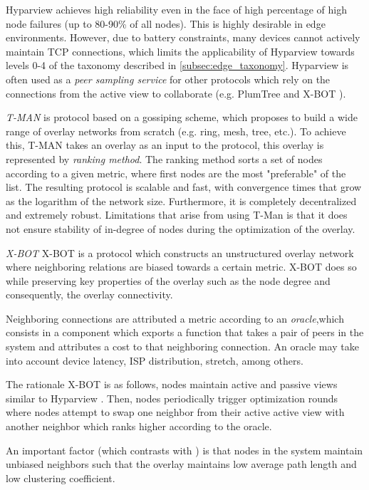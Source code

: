 Hyparview achieves high reliability even in the face of high percentage of high node failures (up to 80-90\% of all nodes). This is highly desirable in edge environments. However, due to battery constraints, many devices cannot actively maintain TCP connections, which limits the applicability of Hyparview towards levels 0-4 of the taxonomy described in \ref{subsec:edge_taxonomy}. Hyparview is often used as a \textit{peer sampling service} for other protocols which rely on the connections from the active view to collaborate  (e.g. PlumTree \cite{leitao2007epidemic} and X-BOT \cite{leitao2012x}).

\textit{T-MAN} \cite{jelasity2005t} is protocol based on a gossiping scheme, which proposes to build a wide range of overlay networks from scratch (e.g. ring, mesh, tree, etc.). To achieve this, T-MAN takes an overlay as an input to the protocol, this overlay is represented by \textit{ranking method}. The ranking method sorts a set of nodes according to a given metric, where first nodes are the most "preferable" of the list. The resulting protocol is scalable and fast, with convergence times that grow as the logarithm of the network size. Furthermore, it is completely decentralized and extremely robust. Limitations that arise from using T-Man is that it does not ensure stability of in-degree of nodes during the optimization of the overlay.

\textit{X-BOT} \cite{leitao2012x} X-BOT is a protocol which constructs an unstructured overlay network where neighboring relations are biased towards a certain metric. X-BOT does so while preserving key properties of the overlay such as the node degree and consequently, the overlay connectivity.

Neighboring connections are attributed a metric according to an \textit{oracle},which consists in a component which exports a function that takes a pair of peers in the system and attributes a cost to that neighboring connection. An oracle may take into account device latency, ISP distribution, stretch, among others. 

The rationale X-BOT is as follows, nodes maintain active and passive views similar to Hyparview \cite{Hyparview}. Then, nodes periodically trigger optimization rounds where nodes attempt to swap one neighbor from their active active view with another neighbor which ranks higher according to the oracle. 

An important factor (which contrasts with \cite{jelasity2005t}) is that nodes in the system maintain unbiased neighbors such that the overlay maintains low average path length and low clustering coefficient.

